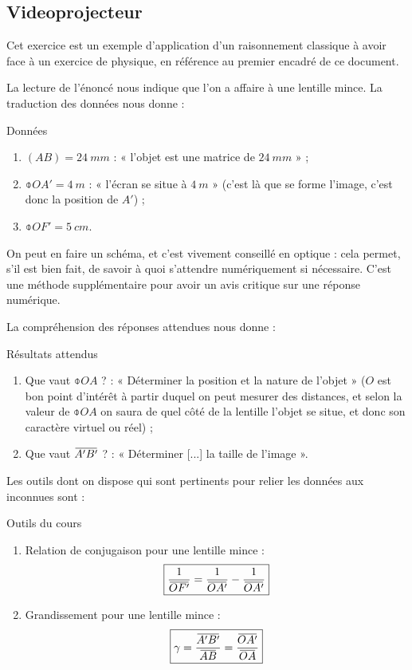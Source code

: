 \documentclass[10pt,a5paper,notitlepage]{book}
\begin{document}
\subsection{Videoprojecteur}\label{ssec:vp}
Cet exercice est un exemple d'application d'un raisonnement classique à avoir
face à un exercice de physique, en référence au premier encadré de ce document.
\bigbreak

La lecture de l'énoncé nous indique que l'on a affaire à une lentille mince. La
traduction des données nous donne :

\begin{vtcb}{Données}
    \begin{enumerate}
        \item $(AB) = \SI{24}{mm}$ : « l'objet est une matrice de $ \SI{24}{mm}$
            » ;
        \item $ \obar{OA'} = \SI{+4}{m}$ : « l'écran se situe à $\SI{4}{m}$ »
            (c'est là que se forme l'image, c'est donc la position de $A'$) ;
        \item $ \obar{OF'} = \SI{+5}{cm}$.
    \end{enumerate}
\end{vtcb}

On peut en faire un schéma, et c'est vivement conseillé en optique : cela
permet, s'il est bien fait, de savoir à quoi s'attendre numériquement si
nécessaire. C'est une méthode supplémentaire pour avoir un avis critique sur une
réponse numérique. \smallbreak

La compréhension des réponses attendues nous donne :
\begin{rtcb}{Résultats attendus}
    \begin{enumerate}
        \item Que vaut $ \obar{OA}$ ? : « Déterminer la position et la nature de
            l'objet » ($O$ est bon point d'intérêt à partir duquel on peut
            mesurer des distances, et selon la valeur  de
            $\obar{OA}$ on saura de quel côté de la lentille l'objet se situe,
            et donc son caractère virtuel ou réel) ;
        \item Que vaut $\ABp$ ? : « Déterminer [...] la taille de l'image ».
    \end{enumerate}
\end{rtcb}

Les outils dont on dispose qui sont pertinents pour relier les données aux
inconnues sont :
\begin{btcb}{Outils du cours}
    \begin{enumerate}
        \item Relation de conjugaison pour une lentille mince :
            \[ \boxed{ \frac{1}{\OF} = \frac{1}{\OAp} - \frac{1}{\OAp}}\]
        \item Grandissement pour une lentille mince :
            \[\boxed{\g = \frac{\ABp}{\ABb} = \frac{\OAp}{\OA}}\]
    \end{enumerate}
\end{btcb}
\end{document}

